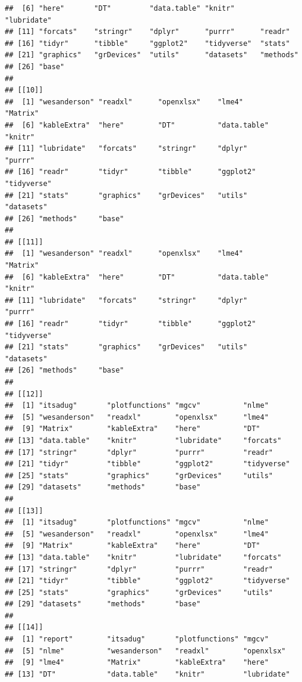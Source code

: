 \documentclass[
]{article}
\begin{document}
\begin{verbatim}
##  [6] "here"       "DT"         "data.table" "knitr"      "lubridate" 
## [11] "forcats"    "stringr"    "dplyr"      "purrr"      "readr"     
## [16] "tidyr"      "tibble"     "ggplot2"    "tidyverse"  "stats"     
## [21] "graphics"   "grDevices"  "utils"      "datasets"   "methods"   
## [26] "base"      
## 
## [[10]]
##  [1] "wesanderson" "readxl"      "openxlsx"    "lme4"        "Matrix"     
##  [6] "kableExtra"  "here"        "DT"          "data.table"  "knitr"      
## [11] "lubridate"   "forcats"     "stringr"     "dplyr"       "purrr"      
## [16] "readr"       "tidyr"       "tibble"      "ggplot2"     "tidyverse"  
## [21] "stats"       "graphics"    "grDevices"   "utils"       "datasets"   
## [26] "methods"     "base"       
## 
## [[11]]
##  [1] "wesanderson" "readxl"      "openxlsx"    "lme4"        "Matrix"     
##  [6] "kableExtra"  "here"        "DT"          "data.table"  "knitr"      
## [11] "lubridate"   "forcats"     "stringr"     "dplyr"       "purrr"      
## [16] "readr"       "tidyr"       "tibble"      "ggplot2"     "tidyverse"  
## [21] "stats"       "graphics"    "grDevices"   "utils"       "datasets"   
## [26] "methods"     "base"       
## 
## [[12]]
##  [1] "itsadug"       "plotfunctions" "mgcv"          "nlme"         
##  [5] "wesanderson"   "readxl"        "openxlsx"      "lme4"         
##  [9] "Matrix"        "kableExtra"    "here"          "DT"           
## [13] "data.table"    "knitr"         "lubridate"     "forcats"      
## [17] "stringr"       "dplyr"         "purrr"         "readr"        
## [21] "tidyr"         "tibble"        "ggplot2"       "tidyverse"    
## [25] "stats"         "graphics"      "grDevices"     "utils"        
## [29] "datasets"      "methods"       "base"         
## 
## [[13]]
##  [1] "itsadug"       "plotfunctions" "mgcv"          "nlme"         
##  [5] "wesanderson"   "readxl"        "openxlsx"      "lme4"         
##  [9] "Matrix"        "kableExtra"    "here"          "DT"           
## [13] "data.table"    "knitr"         "lubridate"     "forcats"      
## [17] "stringr"       "dplyr"         "purrr"         "readr"        
## [21] "tidyr"         "tibble"        "ggplot2"       "tidyverse"    
## [25] "stats"         "graphics"      "grDevices"     "utils"        
## [29] "datasets"      "methods"       "base"         
## 
## [[14]]
##  [1] "report"        "itsadug"       "plotfunctions" "mgcv"         
##  [5] "nlme"          "wesanderson"   "readxl"        "openxlsx"     
##  [9] "lme4"          "Matrix"        "kableExtra"    "here"         
## [13] "DT"            "data.table"    "knitr"         "lubridate"    

\end{verbatim}
\end{document}
